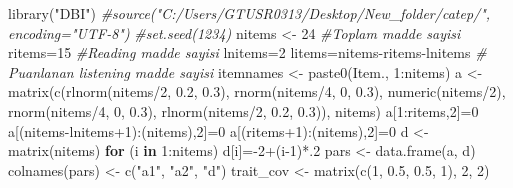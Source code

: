 \documentclass[
]{article}
\newenvironment{Shaded}{\begin{snugshade}}{\end{snugshade}}
\newcommand{\CommentTok}[1]{\textcolor[rgb]{0.56,0.35,0.01}{\textit{#1}}}
\newcommand{\ControlFlowTok}[1]{\textcolor[rgb]{0.13,0.29,0.53}{\textbf{#1}}}
\newcommand{\DecValTok}[1]{\textcolor[rgb]{0.00,0.00,0.81}{#1}}
\newcommand{\FloatTok}[1]{\textcolor[rgb]{0.00,0.00,0.81}{#1}}
\newcommand{\FunctionTok}[1]{\textcolor[rgb]{0.00,0.00,0.00}{#1}}
\newcommand{\NormalTok}[1]{#1}
\newcommand{\OtherTok}[1]{\textcolor[rgb]{0.56,0.35,0.01}{#1}}
\newcommand{\SpecialCharTok}[1]{\textcolor[rgb]{0.00,0.00,0.00}{#1}}
\newcommand{\StringTok}[1]{\textcolor[rgb]{0.31,0.60,0.02}{#1}}
\begin{document}
\begin{Shaded}
\begin{Highlighting}[]
\FunctionTok{library}\NormalTok{(}\StringTok{"DBI"}\NormalTok{)}
\CommentTok{\#source("C:/Users/GTUSR0313/Desktop/New\_folder/catep/", encoding="UTF{-}8")}
\CommentTok{\#set.seed(1234)}
\NormalTok{nitems }\OtherTok{\textless{}{-}} \DecValTok{24} \CommentTok{\#Toplam madde sayisi}
\NormalTok{ritems}\OtherTok{=}\DecValTok{15}    \CommentTok{\#Reading madde sayisi}
\NormalTok{lnitems}\OtherTok{=}\DecValTok{2}   
\NormalTok{litems}\OtherTok{=}\NormalTok{nitems}\SpecialCharTok{{-}}\NormalTok{ritems}\SpecialCharTok{{-}}\NormalTok{lnitems }\CommentTok{\# Puanlanan listening madde sayisi}
\NormalTok{itemnames }\OtherTok{\textless{}{-}} \FunctionTok{paste0}\NormalTok{(}\StringTok{\textquotesingle{}Item.\textquotesingle{}}\NormalTok{, }\DecValTok{1}\SpecialCharTok{:}\NormalTok{nitems)}
\NormalTok{a }\OtherTok{\textless{}{-}} \FunctionTok{matrix}\NormalTok{(}\FunctionTok{c}\NormalTok{(}\FunctionTok{rlnorm}\NormalTok{(nitems}\SpecialCharTok{/}\DecValTok{2}\NormalTok{, }\FloatTok{0.2}\NormalTok{, }\FloatTok{0.3}\NormalTok{), }\FunctionTok{rnorm}\NormalTok{(nitems}\SpecialCharTok{/}\DecValTok{4}\NormalTok{, }\DecValTok{0}\NormalTok{, }\FloatTok{0.3}\NormalTok{), }\FunctionTok{numeric}\NormalTok{(nitems}\SpecialCharTok{/}\DecValTok{2}\NormalTok{),}
              \FunctionTok{rnorm}\NormalTok{(nitems}\SpecialCharTok{/}\DecValTok{4}\NormalTok{, }\DecValTok{0}\NormalTok{, }\FloatTok{0.3}\NormalTok{), }\FunctionTok{rlnorm}\NormalTok{(nitems}\SpecialCharTok{/}\DecValTok{2}\NormalTok{, }\FloatTok{0.2}\NormalTok{, }\FloatTok{0.3}\NormalTok{)), nitems)}
\NormalTok{a[}\DecValTok{1}\SpecialCharTok{:}\NormalTok{ritems,}\DecValTok{2}\NormalTok{]}\OtherTok{=}\DecValTok{0}
\NormalTok{a[(nitems}\SpecialCharTok{{-}}\NormalTok{lnitems}\SpecialCharTok{+}\DecValTok{1}\NormalTok{)}\SpecialCharTok{:}\NormalTok{(nitems),}\DecValTok{2}\NormalTok{]}\OtherTok{=}\DecValTok{0}
\NormalTok{a[(ritems}\SpecialCharTok{+}\DecValTok{1}\NormalTok{)}\SpecialCharTok{:}\NormalTok{(nitems),}\DecValTok{2}\NormalTok{]}\OtherTok{=}\DecValTok{0}
\NormalTok{d }\OtherTok{\textless{}{-}} \FunctionTok{matrix}\NormalTok{(nitems)}
\ControlFlowTok{for}\NormalTok{ (i }\ControlFlowTok{in} \DecValTok{1}\SpecialCharTok{:}\NormalTok{nitems) d[i]}\OtherTok{=}\SpecialCharTok{{-}}\DecValTok{2}\SpecialCharTok{+}\NormalTok{(i}\DecValTok{{-}1}\NormalTok{)}\SpecialCharTok{*}\NormalTok{.}\DecValTok{2}
\NormalTok{pars }\OtherTok{\textless{}{-}} \FunctionTok{data.frame}\NormalTok{(a, d)}
\FunctionTok{colnames}\NormalTok{(pars) }\OtherTok{\textless{}{-}} \FunctionTok{c}\NormalTok{(}\StringTok{"a1"}\NormalTok{, }\StringTok{"a2"}\NormalTok{, }\StringTok{"d"}\NormalTok{)}
\NormalTok{trait\_cov }\OtherTok{\textless{}{-}} \FunctionTok{matrix}\NormalTok{(}\FunctionTok{c}\NormalTok{(}\DecValTok{1}\NormalTok{, }\FloatTok{0.5}\NormalTok{, }\FloatTok{0.5}\NormalTok{, }\DecValTok{1}\NormalTok{), }\DecValTok{2}\NormalTok{, }\DecValTok{2}\NormalTok{)}


\end{Highlighting}
\end{Shaded}
\end{document}
